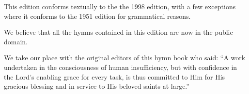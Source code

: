 \documentclass{book}
\begin{document}
This edition conforms textually to the the 1998 edition, with a few exceptions
where it conforms to the 1951 edition for grammatical reasons.

We believe that all the hymns contained in this edition are now in the public
domain.

We take our place with the original editors of this hymn book who said: ``A
work undertaken in the consciousness of human insufficiency, but with
confidence in the Lord's enabling grace for every task, is thus committed to
Him for His gracious blessing and in service to His beloved saints at large.''

\vspace*{\fill}

\afterpage{\null\newpage}

\restoregeometry



\newpage
{}

\end{document}
